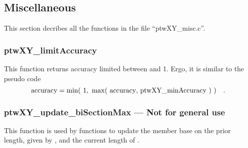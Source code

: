 \subsection{Miscellaneous}
This section decribes all the functions in the file ``ptwXY\_misc.c''.

\subsubsection{ptwXY\_limitAccuracy}
This function returns accuracy limited between  and 1. Ergo, it is similar to the pseudo code
\begin{equation}
    {\rm accuracy} = {\rm min}( \ 1, \ {\rm max}( \ {\rm accuracy,}\ {\rm ptwXY\_minAccuracy} \ ) \ ) \ \ \ .
\end{equation}

\subsubsection{ptwXY\_update\_biSectionMax --- Not for general use}
This function is used by  functions to update the member  base on the prior length, given
by , and the current length of .

